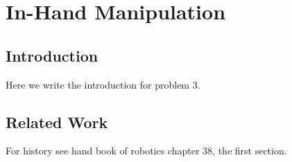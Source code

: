 \chapter{In-Hand Manipulation} \label{ch:3-in-hand-manipulation}

\section{Introduction} \label{sec:3-in-hand-manipulation-introduction}
Here we write the introduction for problem 3.


\section{Related Work} \label{sec:3-in-hand-manipulation-related-work}





For history see hand book of robotics chapter 38, the first section.
